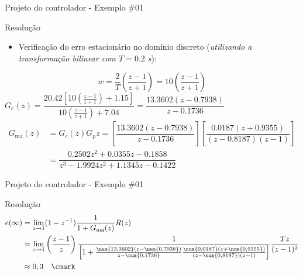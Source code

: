 \begin{frame}{Projeto do controlador - Exemplo \#01}
\begin{block}{Resolução}
\begin{itemize}
    \item Verificação do erro estacionário no domínio discreto (\textit{utilizando a transformação bilinear com $T = \num{0,2}$ s}):
\end{itemize}
    \begin{equation*}
        w = \dfrac{2}{T}\left(\dfrac{z - 1}{z + 1}\right) = 10\left(\dfrac{z - 1}{z + 1}\right)
    \end{equation*}
    \centering
        $G_c(z) = \dfrac{\num{20,42}\left [ 10\left( \frac{z - 1}{z + 1}\right) + \num{1,15} \right ]}{10 \left( \frac{z - 1}{z + 1}\right) + \num{7,04}} = \dfrac{\num{13,3602}(z - \num{0,7938})}{z - \num{0,1736}}$
    \begin{align*}
		G_{\text{ma}}(z)&=G_c(z)G_p{z} = \left[\dfrac{\num{13,3602}(z - \num{0,7938})}{z - \num{0,1736}}\right]\left[\dfrac{\num{0,0187}(z + \num{0,9355})}{(z - \num{0,8187})(z - 1)}\right]\\
		&=\dfrac{\num{0,2502}z^2 + \num{0,0355}z - \num{0,1858}}{z^3 - \num{1,9924}z^2 + \num{1,1345}z - \num{0,1422}}
		\end{align*}
    \end{block}
\end{frame}

\begin{frame}{Projeto do controlador - Exemplo \#01}
\begin{block}{Resolução}
\vspace{0.2cm}
		\begin{align*}
         e(\infty)&= \lim_{z \to 1} (1 - z^{-1}) \dfrac{1}{1 + G_{\text{ma}}(z)}R(z)\\ 
         &= \lim_{z \to 1} \left ( \frac{z - 1}{z} \right ) \frac{1}{\left [ 1 + \frac{\num{13,3602}(z - \num{0,7938})}{z - \num{0,1736}}\frac{\num{0,0187}(z + \num{0,9355})}{(z - \num{0,8187})(z - 1)} \right ]} \frac{Tz}{(z - 1)^2}\\ 
        &\approx 0,3 \quad \text{\cmark}
		\end{align*}
    \end{block}
\end{frame}

